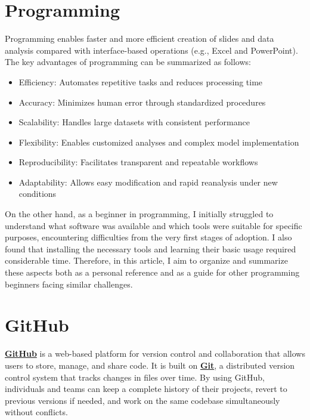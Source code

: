 \documentclass[11pt]{article}
\begin{document}
\section{Programming}

Programming enables faster and more efficient creation of slides and data analysis compared with interface-based operations (e.g., Excel and PowerPoint). 
The key advantages of programming can be summarized as follows:
\begin{itemize}
\item Efficiency: Automates repetitive tasks and reduces processing time
\item Accuracy: Minimizes human error through standardized procedures
\item Scalability: Handles large datasets with consistent performance
\item Flexibility: Enables customized analyses and complex model implementation
\item Reproducibility: Facilitates transparent and repeatable workflows
\item Adaptability: Allows easy modification and rapid reanalysis under new conditions
\end{itemize}
On the other hand, as a beginner in programming, I initially struggled to understand what software was available and which tools were suitable for specific purposes, encountering difficulties from the very first stages of adoption. 
I also found that installing the necessary tools and learning their basic usage required considerable time. 
Therefore, in this article, I aim to organize and summarize these aspects both as a personal reference and as a guide for other programming beginners facing similar challenges.


\section{GitHub}

\href{https://github.co.jp/}{\textbf{GitHub}} is a web-based platform for version control 
and collaboration that allows users to store, manage, and share code. 
It is built on \href{https://git-scm.com/}{\textbf{Git}}, 
a distributed version control system that tracks changes in files over time. 
By using GitHub, individuals and teams can keep a complete history of their projects, revert to previous versions if needed, and work on the same codebase simultaneously without conflicts.
\end{document}
